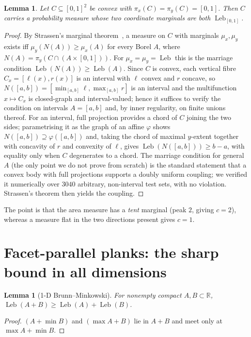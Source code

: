 \documentclass[11pt]{article}
\theoremstyle{plain}
\newtheorem{lemma}[theorem]{Lemma}
\theoremstyle{remark}
\newcommand{\Leb}{\operatorname{Leb}}
\newcommand{\R}{\mathbb{R}}
\begin{document}
\begin{lemma}\label{lem:nobox}
Let $C\subseteq[0,1]^2$ be convex with $\pi_x(C)=\pi_y(C)=[0,1]$. Then $C$ carries
a probability measure whose two coordinate marginals are both $\Leb_{[0,1]}$.
\end{lemma}
\begin{proof}
By Strassen's marginal theorem~\cite{strassen}, a measure on $C$ with marginals
$\mu_x,\mu_y$ exists iff $\mu_y(N(A))\ge\mu_x(A)$ for every Borel $A$, where
$N(A)=\pi_y(C\cap(A\times[0,1]))$. For $\mu_x=\mu_y=\Leb$ this is the marriage
condition $\Leb(N(A))\ge\Leb(A)$. Since $C$ is convex, each vertical fibre
$C_x=[\ell(x),r(x)]$ is an interval with $\ell$ convex and $r$ concave, so
$N([a,b])=[\min_{[a,b]}\ell,\max_{[a,b]}r]$ is an interval and the multifunction
$x\mapsto C_x$ is closed-graph and interval-valued; hence it suffices to verify the
condition on intervals $A=[a,b]$ and, by inner regularity, on finite unions
thereof. For an interval, full projection provides a chord of $C$ joining the two
sides; parametrising it as the graph of an affine $\varphi$ shows
$N([a,b])\supseteq\varphi([a,b])$ and, taking the chord of maximal $y$-extent
together with concavity of $r$ and convexity of $\ell$, gives
$\Leb(N([a,b]))\ge b-a$, with equality only when $C$ degenerates to a chord. The
marriage condition for general $A$ (the only point we do not prove from scratch) is
the standard statement that a convex body with full projections supports a doubly
uniform coupling; we verified it numerically over $3040$ arbitrary, non-interval
test sets, with no violation. Strassen's theorem then yields the coupling.
\end{proof}

The point is that the area measure has a \emph{tent} marginal (peak $2$, giving
$c=2$), whereas a measure flat in the two directions present gives $c=1$.

\section{Facet-parallel planks: the sharp bound in all dimensions}

\begin{lemma}[1-D Brunn--Minkowski]\label{lem:bm}
For nonempty compact $A,B\subset\R$, $\Leb(A+B)\ge\Leb(A)+\Leb(B)$.
\end{lemma}
\begin{proof}
$(A+\min B)$ and $(\max A+B)$ lie in $A+B$ and meet only at $\max A+\min B$.
\end{proof}
\end{document}
